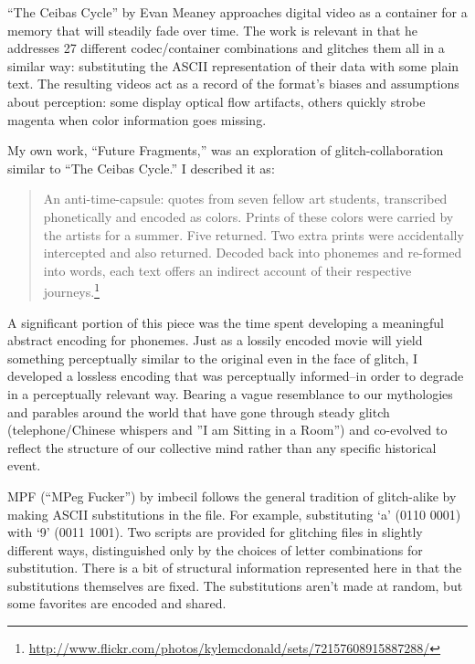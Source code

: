 \documentclass{thesis}
\begin{document}
	\cite{evan_meaney_ceibas:_2008}
	``The Ceibas Cycle'' by Evan Meaney approaches digital video as a container for a memory that will steadily fade over time. The work is relevant in that he addresses 27 different codec/container combinations and glitches them all in a similar way: substituting the ASCII representation of their data with some plain text. The resulting videos act as a record of the format's biases and assumptions about perception: some display optical flow artifacts, others quickly strobe magenta when color information goes missing.
	
	My own work, ``Future Fragments,'' was an exploration of glitch-collaboration similar to ``The Ceibas Cycle.'' I described it as:
	
	\begin{quote}
	An anti-time-capsule: quotes from seven fellow art students, transcribed phonetically and encoded as colors. Prints of these colors were carried by the artists for a summer. Five returned. Two extra prints were accidentally intercepted and also returned. Decoded back into phonemes and re-formed into words, each text offers an indirect account of their respective journeys.\footnote{\url{http://www.flickr.com/photos/kylemcdonald/sets/72157608915887288/}}
	\end{quote}
	
	A significant portion of this piece was the time spent developing a meaningful abstract encoding for phonemes. Just as a lossily encoded movie will yield something perceptually similar to the original even in the face of glitch, I developed a lossless encoding that was perceptually informed--in order to degrade in a perceptually relevant way. Bearing a vague resemblance to our mythologies and parables around the world that have gone through steady glitch (telephone/Chinese whispers and ''I am Sitting in a Room'') and co-evolved to reflect the structure of our collective mind rather than any specific historical event.
	
	\cite{imbecil_mpeg_2004}
	MPF (``MPeg Fucker'') by imbecil follows the general tradition of glitch-alike by making ASCII substitutions in the file. For example, substituting `a' (0110 0001) with `9' (0011 1001). Two scripts are provided for glitching files in slightly different ways, distinguished only by the choices of letter combinations for substitution. There is a bit of structural information represented here in that the substitutions themselves are fixed. The substitutions aren't made at random, but some favorites are encoded and shared.
	
\end{document}
